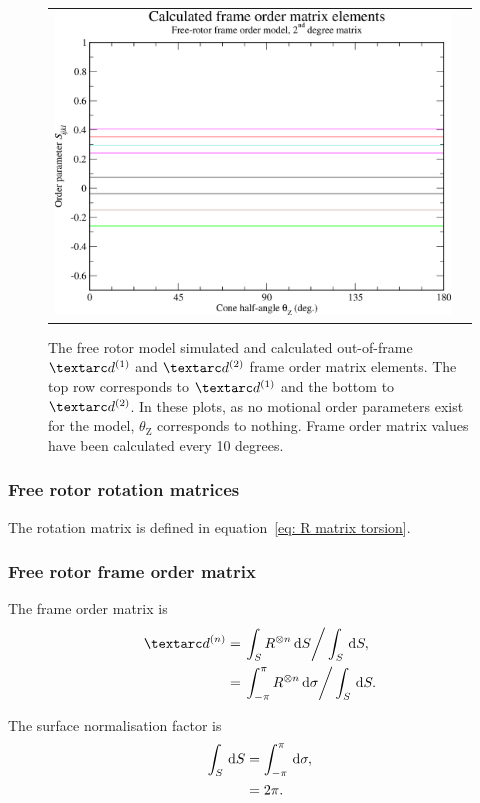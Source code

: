 \begin{figure}
\begin{tabular}{@{}cc@{}}
    \includegraphics[width=.5\textwidth]{images/frame_order_matrix/Sijkl_free_rotor_out_of_frame_theta_z_calc.eps} \\
  \end{tabular}
  \caption[Free rotor simulated and calculated out-of-frame Daeg$^{(1)}$ and Daeg$^{(2)}$ elements.]{
    The free rotor model simulated and calculated out-of-frame $\FOone$ and $\FOtwo$ frame order matrix elements.
    The top row corresponds to $\FOone$ and the bottom to $\FOtwo$.
    In these plots, as no motional order parameters exist for the model, $\theta_\textrm{Z}$ corresponds to nothing.
    Frame order matrix values have been calculated every 10 degrees.
  }
  \label{fig: simulated and calculated out-of-frame 1st and 2nd degree free rotor frame order}
\end{figure}

\subsubsection{Free rotor rotation matrices}

The rotation matrix is defined in equation~\ref{eq: R matrix torsion}.

\subsubsection{Free rotor frame order matrix}

The frame order matrix is
\begin{subequations}
\begin{align}
    \FOn &= \left. \int_S R^{\otimes n} \diff S \right / \int_S \diff S , \\
         &= \left. \int_{-\pi}^{\pi} R^{\otimes n} \diff \sigma  \right / \int_S \diff S .
\end{align}
\end{subequations}

The surface normalisation factor is
\begin{subequations}
\begin{align}
    \int_S \,\mathrm{d} S &= \int_{-\pi}^{\pi} \,\mathrm{d} \sigma , \\
                   &= 2\pi .
\end{align}
\end{subequations}



